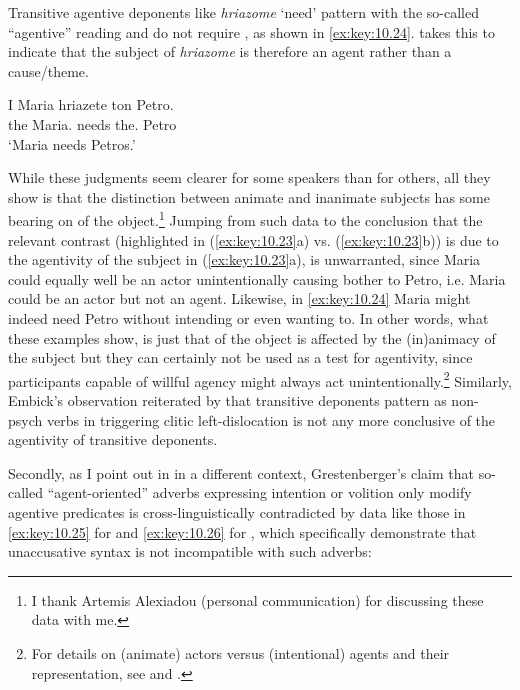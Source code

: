 \documentclass[output=paper]{langsci/langscibook}
\begin{document}
Transitive agentive deponents like \emph{hriazome} ‘need’ pattern with the
so-called “agentive” reading and do not require , as shown in
\eqref{ex:key:10.24}. \citeauthor{Grestenberger2014} takes this to indicate that the subject of
\emph{hriazome} is therefore an agent rather than a cause/theme.

\ea\label{ex:key:10.24} 
    \sn
    \gll    I    Maria    hriazete  ton  Petro.\\
            the  Maria.\Nom{}  needs the.\Acc{}  Petro\\
    \glt    ‘Maria needs Petros.’
\z

While these judgments seem clearer for some  speakers than for others, all
they show is that the distinction between animate and inanimate subjects has
some bearing on  of the object.\footnote{I thank Artemis
Alexiadou (personal communication) for discussing these data with me.} Jumping
from such data to the conclusion that the relevant contrast (highlighted in
(\ref{ex:key:10.23}a) vs. (\ref{ex:key:10.23}b)) is due to the agentivity of
the subject in (\ref{ex:key:10.23}a), is unwarranted, since Maria could equally
well be an actor unintentionally causing bother to Petro, i.e. Maria could be
an actor but not an agent. Likewise, in \eqref{ex:key:10.24} Maria might indeed
need Petro without intending or even wanting to. In other words, what these
examples show, is just that  of the object is affected by the
(in)animacy of the subject but they can certainly not be used as a test for
agentivity, since participants capable of willful agency might always act
unintentionally.\footnote{For details on (animate) actors versus (intentional)
agents and their representation, see \citet{Demirdache1997} and
\textcite{Kallulli2006b,Kallulli2007}.}  Similarly, Embick’s observation
reiterated by \citeauthor{Grestenberger2014} that transitive deponents pattern as non-psych
verbs in triggering clitic left-dislocation is not
any more conclusive of the agentivity of transitive deponents.

Secondly, as I point out in \citet{Kallulli2007} in a different context,
Grestenberger’s claim that so-called “agent-oriented” adverbs expressing
intention or volition only modify agentive predicates is cross-linguistically
contradicted by data like those in \eqref{ex:key:10.25} for  and
\eqref{ex:key:10.26} for , which specifically demonstrate that
unaccusative
syntax is not incompatible with such adverbs:
\end{document}

